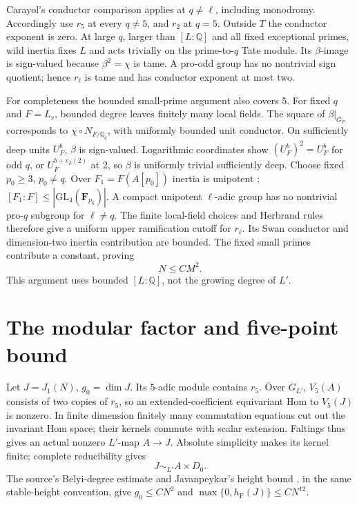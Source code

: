 \documentclass[11pt]{article}
\newcommand{\Q}{\mathbb Q}
\newcommand{\hF}{h_{\mathrm F}}
\begin{document}
Carayol's conductor comparison \cite{Carayol} applies at $q\ne\ell$,
including monodromy. Accordingly use $r_5$ at every $q\ne5$, and
$r_2$ at $q=5$. Outside $T$ the conductor exponent is zero.
At large $q$, larger than $[L:\Q]$ and all fixed exceptional primes,
wild inertia fixes $L$ and acts trivially on the prime-to-$q$ Tate module.
Its $\beta$-image is sign-valued because $\beta^2=\chi$ is tame.
A pro-odd group has no nontrivial sign quotient; hence $r_\ell$ is tame
and has conductor exponent at most two.

For completeness the bounded small-prime argument also covers $5$.
For fixed $q$ and $F=L_v$, bounded degree leaves finitely many local fields.
The square of $\beta|_{G_F}$ corresponds to $\chi\circ N_{F/\Q_q}$,
with uniformly bounded unit conductor. On sufficiently deep units
$U_F^b$, $\beta$ is sign-valued. Logarithmic coordinates show
$(U_F^b)^2=U_F^b$ for odd $q$, or $U_F^{b+v_F(2)}$ at $2$,
so $\beta$ is uniformly trivial sufficiently deep.
Choose fixed $p_0\ge3$, $p_0\ne q$.
Over $F_1=F(A[p_0])$ inertia is unipotent \cite{SilverbergZarhin};
$[F_1:F]\le|\mathrm{GL}_4(\mathbf F_{p_0})|$.
A compact unipotent $\ell$-adic group has no nontrivial pro-$q$ subgroup
for $\ell\ne q$. The finite local-field choices and Herbrand rules
therefore give a uniform upper ramification cutoff for $r_\ell$.
Its Swan conductor and dimension-two inertia contribution are bounded.
The fixed small primes contribute a constant, proving
\begin{equation}\label{level}
                              N\le CM^2.
\end{equation}
This argument uses bounded $[L:\Q]$, not the growing degree of $L'$.

\section{The modular factor and five-point bound}
Let $J=J_1(N)$, $g_0=\dim J$. Its $5$-adic module contains $r_5$.
Over $G_{L'}$, $V_5(A)$ consists of two copies of $r_5$, so an
extended-coefficient equivariant Hom to $V_5(J)$ is nonzero.
In finite dimension finitely many commutation equations cut out the
invariant Hom space; their kernels commute with scalar extension.
Faltings thus gives an actual nonzero $L'$-map $A\to J$.
Absolute simplicity makes its kernel finite; complete reducibility gives
\[
                           J\sim_{L'} A\times D_0.
\]
The source's Belyi-degree estimate and Javanpeykar's height bound
\cite{Javanpeykar}, in the same stable-height convention, give
$g_0\le CN^2$ and $\max\{0,\hF(J)\}\le CN^{12}$.
\end{document}
